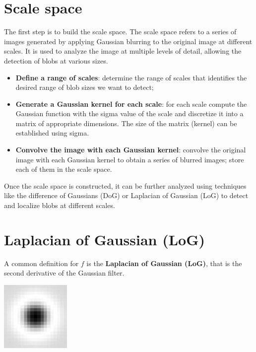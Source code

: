 \documentclass{article}
\begin{document}
\section*{Scale space}

The first step is to build the scale space. The scale space refers to a series of images generated by applying Gaussian blurring to the original image at different scales. It is used to analyze the image at multiple levels of detail, allowing the detection of blobs at various sizes.

\begin{itemize}
    \item \textbf{Define a range of scales}: determine the range of scales that identifies the desired range of blob sizes we want to detect;
    \item \textbf{Generate a Gaussian kernel for each scale}: for each scale compute the Gaussian function with the sigma value of the scale and discretize it into a matrix of appropriate dimensions. The size of the matrix (kernel) can be established using sigma.
    \item \textbf{Convolve the image with each Gaussian kernel}: convolve the original image with each Gaussian kernel to obtain a series of blurred images; store each of them in the scale space.
\end{itemize}

Once the scale space is constructed, it can be further analyzed using techniques like the difference of Gaussians (DoG) or Laplacian of Gaussian (LoG) to detect and localize blobs at different scales.

\newpage

\section*{Laplacian of Gaussian (LoG)}

A common definition for $f$ is the \textbf{Laplacian of Gaussian (LoG)}, that is the second derivative of the Gaussian filter.

\begin{center}
    \includegraphics[width=.3\linewidth]{images/laplacian_of_gaussian.jpg}    
\end{center}
\end{document}
